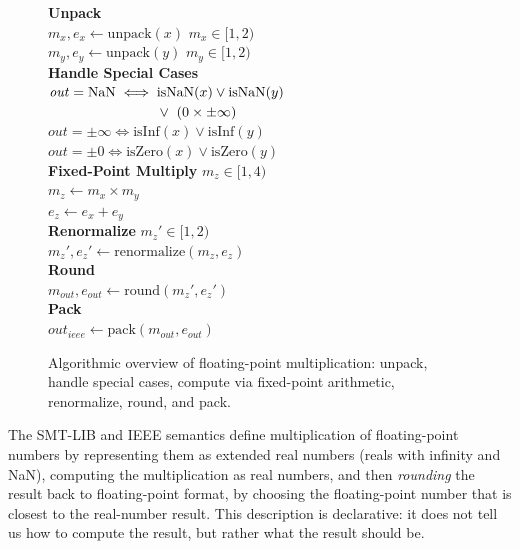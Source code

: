 \begin{figure}
\centering
\small
\begin{minipage}{0.40\textwidth}
\textbf{Unpack}\\[2pt]
\quad $m_x, e_x \gets \mathrm{unpack}(x)$ \quad $m_x \in [1,2)$\\
\quad $m_y, e_y \gets \mathrm{unpack}(y)$ \quad $m_y \in [1,2)$\\[6pt]
%
\textbf{Handle Special Cases}\\[2pt]
\quad $\mathit{out} = \mathrm{NaN} \iff \mathrm{isNaN}(x) \lor \mathrm{isNaN}(y)$\\
\quad $\phantom{\mathit{out} = \nan \iff{}} \lor\ (0 \times \pm\infty)$\\
\quad $\mathit{out} = \pm\infty \iff \mathrm{isInf}(x) \lor \mathrm{isInf}(y)$\\
\quad $\mathit{out} = \pm 0 \iff \mathrm{isZero}(x) \lor \mathrm{isZero}(y)$\\[6pt]
%
\textbf{Fixed-Point Multiply} \quad $m_z \in [1, 4)$\\[2pt]
\quad $m_z \gets m_x \times m_y$\\
\quad $e_z \gets e_x + e_y$\\[6pt]
%
\textbf{Renormalize} \quad $m_z' \in [1, 2)$\\[2pt]
\quad $m_z', e_z' \gets \mathrm{renormalize}(m_z, e_z)$\\[4pt]
%
\textbf{Round}\\[2pt]
\quad $m_\mathit{out}, e_\mathit{out} \gets \mathrm{round}(m_z', e_z')$\\[6pt]
%
\textbf{Pack}\\[2pt]
\quad $\mathit{out}_\mathit{ieee} \gets \mathrm{pack}(m_\mathit{out}, e_\mathit{out})$
\end{minipage}
\caption{Algorithmic overview of floating-point multiplication:
  unpack, handle special cases, compute via fixed-point arithmetic,
  renormalize, round, and pack.}
\label{fig:fp:algo-overview}
\end{figure}

The SMT-LIB and IEEE semantics define multiplication of floating-point numbers
by representing them as extended real numbers (reals with infinity and NaN),
computing the multiplication as real numbers, and then \emph{rounding} the result back to floating-point format,
by choosing the floating-point number that is closest to the real-number result.
This description is declarative: it does not tell us how to compute the result, but rather what the result should be.

